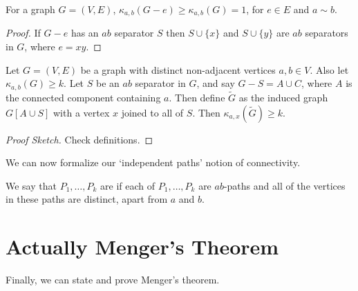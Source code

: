 \documentclass[a4paper]{scrreprt}
\begin{document}
\begin{lemma}
	For a graph $G = (V, E)$, 
	$\kappa_{a, b}(G - e) \geq \kappa_{a, b}(G) = 1$, for $e \in E$ and $a \sim b$.
\end{lemma}
\begin{proof}
	If $G - e$ has an $ab$ separator $S$ then $S \cup \{x\}$ and $S \cup \{y\}$ are $ab$ separators in $G$, where $e = xy$.
\end{proof}



\begin{lemma}
	Let $G = (V, E)$ be a graph with distinct non-adjacent vertices $a, b \in V$. Also let $\kappa_{a, b}(G) \geq k$. Let $S$ be an $ab$ separator in $G$, and say $G - S = A \cup C$, where $A$ is the connected component containing $a$. Then define $\tilde{G}$ as the induced graph $G[A \cup S]$ with a vertex $x$ joined to all of $S$. Then $\kappa_{a, x}(\tilde{G}) \geq k$.
\end{lemma}
\begin{proof}[Proof Sketch]
	Check definitions.
\end{proof}

We can now formalize our `independent paths' notion of connectivity.

\begin{definition}
	We say that $P_1, \dots, P_k$ are  if each of $P_1, \dots, P_k$ are $ab$-paths and all of the vertices in these paths are distinct, apart from $a$ and $b$.
\end{definition}

\section{Actually Menger's Theorem}

Finally, we can state and prove Menger's theorem.
\end{document}
